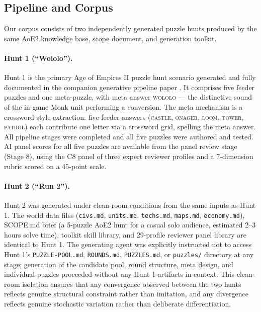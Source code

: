 \subsection{Pipeline and Corpus}
\label{sec:corpus}

Our corpus consists of two independently generated puzzle hunts produced by the same AoE2 knowledge base, scope document, and generation toolkit.

\paragraph{Hunt 1 (``Wololo'').} Hunt 1 is the primary Age of Empires II puzzle hunt scenario generated and fully documented in the companion generative pipeline paper \cite{paper2pipeline}. It comprises five feeder puzzles and one meta-puzzle, with meta answer \textsc{wololo} --- the distinctive sound of the in-game Monk unit performing a conversion. The meta mechanism is a crossword-style extraction: five feeder answers (\textsc{castle}, \textsc{onager}, \textsc{loom}, \textsc{tower}, \textsc{patrol}) each contribute one letter via a crossword grid, spelling the meta answer. All pipeline stages were completed and all five puzzles were authored and tested. AI panel scores for all five puzzles are available from the panel review stage (Stage 8), using the C8 panel of three expert reviewer profiles and a 7-dimension rubric scored on a 45-point scale.

\paragraph{Hunt 2 (``Run 2'').} Hunt 2 was generated under clean-room conditions from the same inputs as Hunt 1. The world data files (\texttt{civs.md}, \texttt{units.md}, \texttt{techs.md}, \texttt{maps.md}, \texttt{economy.md}), SCOPE.md brief (a 5-puzzle AoE2 hunt for a casual solo audience, estimated 2--3 hours solve time), toolkit skill library, and 29-profile reviewer panel library are identical to Hunt 1. The generating agent was explicitly instructed not to access Hunt 1's \texttt{PUZZLE-POOL.md}, \texttt{ROUNDS.md}, \texttt{PUZZLES.md}, or \texttt{puzzles/} directory at any stage; generation of the candidate pool, round structure, meta design, and individual puzzles proceeded without any Hunt 1 artifacts in context. This clean-room isolation ensures that any convergence observed between the two hunts reflects genuine structural constraint rather than imitation, and any divergence reflects genuine stochastic variation rather than deliberate differentiation.

